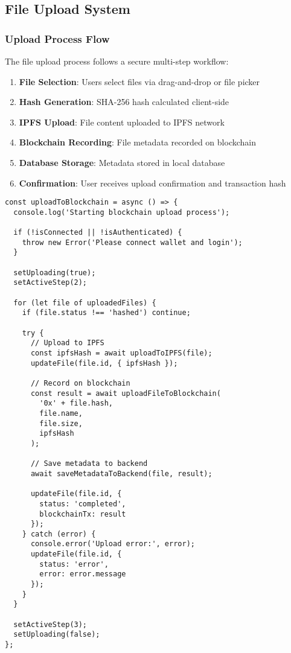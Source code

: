 \documentclass[11pt,a4paper]{article}
\begin{document}
\subsection{File Upload System}

\subsubsection{Upload Process Flow}
The file upload process follows a secure multi-step workflow:

\begin{enumerate}
    \item \textbf{File Selection}: Users select files via drag-and-drop or file picker
    \item \textbf{Hash Generation}: SHA-256 hash calculated client-side
    \item \textbf{IPFS Upload}: File content uploaded to IPFS network
    \item \textbf{Blockchain Recording}: File metadata recorded on blockchain
    \item \textbf{Database Storage}: Metadata stored in local database
    \item \textbf{Confirmation}: User receives upload confirmation and transaction hash
\end{enumerate}

\begin{lstlisting}[style=javascript, caption=File Upload Implementation]
const uploadToBlockchain = async () => {
  console.log('Starting blockchain upload process');
  
  if (!isConnected || !isAuthenticated) {
    throw new Error('Please connect wallet and login');
  }

  setUploading(true);
  setActiveStep(2);

  for (let file of uploadedFiles) {
    if (file.status !== 'hashed') continue;

    try {
      // Upload to IPFS
      const ipfsHash = await uploadToIPFS(file);
      updateFile(file.id, { ipfsHash });

      // Record on blockchain
      const result = await uploadFileToBlockchain(
        '0x' + file.hash,
        file.name,
        file.size,
        ipfsHash
      );

      // Save metadata to backend
      await saveMetadataToBackend(file, result);
      
      updateFile(file.id, { 
        status: 'completed', 
        blockchainTx: result 
      });
    } catch (error) {
      console.error('Upload error:', error);
      updateFile(file.id, { 
        status: 'error', 
        error: error.message 
      });
    }
  }

  setActiveStep(3);
  setUploading(false);
};
\end{lstlisting}
\end{document}

